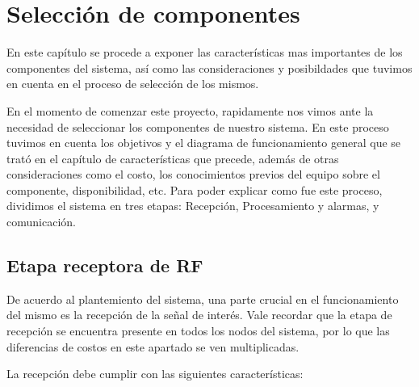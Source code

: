 
\chapter{Selección de componentes}
En este capítulo se procede a exponer las características mas importantes  de los componentes del sistema, así como las consideraciones y 
posibildades que tuvimos en cuenta en el proceso de selección de los mismos. \par

En el momento de comenzar este proyecto, rapidamente nos vimos ante la necesidad de seleccionar los componentes de nuestro sistema. 
En este proceso tuvimos en cuenta los objetivos y el diagrama de funcionamiento general que se trató en el capítulo de características que precede,
además de otras consideraciones como el costo, los conocimientos previos del equipo sobre el componente, disponibilidad, etc. 
Para poder explicar como fue este proceso, dividimos el sistema en tres etapas: Recepción, Procesamiento y alarmas, y comunicación.

\section{Etapa receptora de RF} \par
De acuerdo al plantemiento del sistema, una parte crucial en el funcionamiento del mismo es la recepción de la señal de interés.
Vale recordar que la etapa de recepción se encuentra presente en todos los nodos del sistema, por lo que las diferencias de costos
en este apartado se ven multiplicadas.\par
La recepción debe cumplir con las siguientes características:

